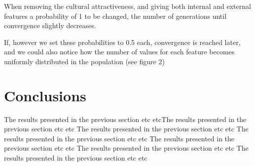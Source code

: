 \documentclass[twoside, 11pt, a4paper]{article}
\begin{document}
When removing the cultural attractiveness, and giving both internal and external features a probability of 1 to be changed, the number of generations until convergence slightly decreases.

If, however we set these probabilities to 0.5 each, convergence is reached later, and we could also notice how the number of values for each feature becomes uniformly distributed in the population (see figure 2)





\section{Conclusions}

The results presented in the previous section  etc etcThe results presented in the previous section  etc etc
The results presented in the previous section  etc etc
The results presented in the previous section  etc etc
The results presented in the previous section  etc etc
The results presented in the previous section  etc etc
The results presented in the previous section  etc etc

\newpage

\vskip 0.2in


\end{document}
